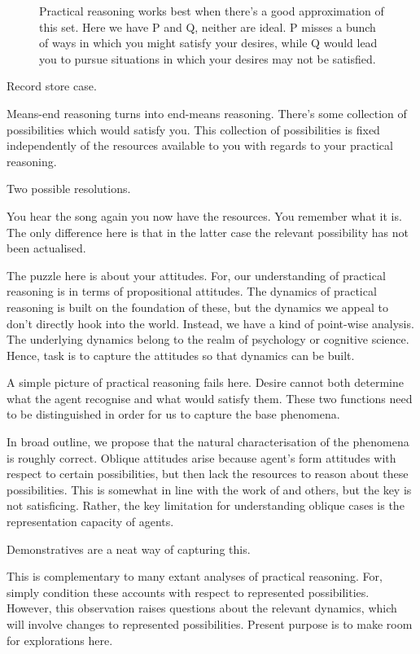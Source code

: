 \documentclass[10pt]{article}
\begin{document}
\begin{figure}[ht]
  \caption{Practical reasoning works best when there's a good approximation of this set.
    Here we have P and Q, neither are ideal.
    P misses a bunch of ways in which you might satisfy your desires, while Q would lead you to pursue situations in which your desires may not be satisfied.}
\end{figure}

\newpage



Record store case.

Means-end reasoning turns into end-means reasoning.
There's some collection of possibilities which would satisfy you.
This collection of possibilities is fixed independently of the resources available to you with regards to your practical reasoning.

Two possible resolutions.

You hear the song again you now have the resources.
You remember what it is.
The only difference here is that in the latter case the relevant possibility has not been actualised.

The puzzle here is about your attitudes.
For, our understanding of practical reasoning is in terms of propositional attitudes.
The dynamics of practical reasoning is built on the foundation of these, but the dynamics we appeal to don't directly hook into the world.
Instead, we have a kind of point-wise analysis.
The underlying dynamics belong to the realm of psychology or cognitive science.
Hence, task is to capture the attitudes so that dynamics can be built.

A simple picture of practical reasoning fails here.
Desire cannot both determine what the agent recognise and what would satisfy them.
These two functions need to be distinguished in order for us to capture the base phenomena.

In broad outline, we propose that the natural characterisation of the phenomena is roughly correct.
Oblique attitudes arise because agent's form attitudes with respect to certain possibilities, but then lack the resources to reason about these possibilities.
This is somewhat in line with the work of \citeauthor{Simon:1997aa} and others, but the key is not satisficing.
Rather, the key limitation for understanding oblique cases is the representation capacity of agents.

Demonstratives are a neat way of capturing this.

This is complementary to many extant analyses of practical reasoning.
For, simply condition these accounts with respect to represented possibilities.
However, this observation raises questions about the relevant dynamics, which will involve changes to represented possibilities.
Present purpose is to make room for explorations here.
\end{document}
